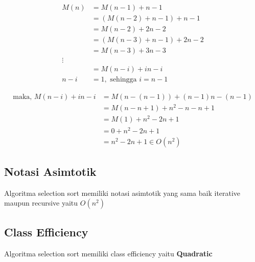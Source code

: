 \documentclass[12pt]{article}
\begin{document}
\begin{align}
    M(n) &=M(n-1) + n -1
    \nonumber
    \\
    &= (M(n-2) + n -1) + n - 1
    \nonumber
    \\
    &= M(n-2) + 2n - 2
    \nonumber
    \\
    &= (M(n-3) + n-1) + 2n - 2
    \nonumber
    \\
    &= M(n-3) + 3n - 3
    \nonumber
    \\ \vdots
    \nonumber
    \\
    &= M(n-i) + in-i
    \nonumber
    \\
    n-i &= 1, \text{ sehingga } i = n - 1
\end{align}

\begin{align}
    \text{maka, }M(n-i) + in - i &= M(n-(n-1)) + (n-1)n - (n-1)
    \nonumber
    \\
    &= M(n-n+1) + n^2 - n - n + 1
    \nonumber
    \\
    &= M(1) + n^2 - 2n+1
    \nonumber
    \\
    &= 0 + n^2 - 2n + 1
    \nonumber
    \\
    &= n^2 - 2n + 1 \in O(n^2)
\end{align}
\subsection{Notasi Asimtotik}
Algoritma selection sort memiliki notasi asimtotik yang sama baik iterative maupun recursive yaitu $O(n^2)$
\subsection{Class Efficiency}
Algoritma selection sort memiliki class efficiency yaitu \textbf{Quadratic}
\newpage
\end{document}
